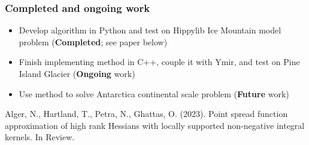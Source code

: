 \documentclass[10pt,final,xcolor=dvipsnames]{beamer}
\begin{document}
\begin{frame}
	\frametitle{Completed and ongoing work}
	
	\begin{itemize}
		\setlength\itemsep{1.5em}
		\item Develop algorithm in Python and test on Hippylib Ice Mountain model problem (\textbf{Completed}; see paper below)
		\item Finish implementing method in C++, couple it with Ymir, and test on Pine Island Glacier (\textbf{Ongoing} work)
		\item Use method to solve Antarctica continental scale problem (\textbf{Future} work)
	\end{itemize}
	\vspace{0.2in}
	{\small Alger, N., Hartland, T., Petra, N., Ghattas, O. (2023). Point spread function approximation of high rank Hessians with locally supported non-negative integral kernels. In Review.}
\end{frame}
\end{document}

